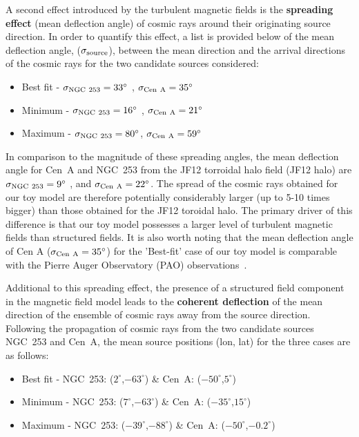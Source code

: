 \documentclass[usenatbib]{mnras}
\begin{document}
A second effect introduced by the turbulent magnetic fields is the {\bf spreading effect} (mean deflection angle) of cosmic rays around their originating source direction. In order to quantify this effect, a list is provided below of the mean deflection angle, ($\sigma_{\rm source}$), between the mean direction and the arrival directions of the cosmic rays for the two candidate sources considered:
\newline
\begin{itemize}
        \item Best fit - $\sigma_{\rm NGC~253} = 33^{\circ}$ , {$\sigma_{\rm Cen~A} = 35^{\circ}$}
        \item Minimum - $\sigma_{\rm NGC~253} = 16^{\circ}$ , $\sigma_{\rm Cen~A} = 21^{\circ}$
        \item Maximum - $\sigma_{\rm NGC~253} = 80^{\circ}$, $\sigma_{\rm Cen~A} = 59^{\circ}$
\end{itemize}

In comparison to the magnitude of these spreading angles, the mean deflection angle for Cen~A and NGC~253 from the JF12 torroidal halo field (JF12 halo) \citep{JF12}  are  $\sigma_{\rm NGC~253} = 9^{\circ}$ , and {$\sigma_{\rm Cen~A} = 22^{\circ}$}.  The spread of the cosmic rays obtained for our toy model are therefore potentially considerably larger (up to 5-10 times bigger) than those obtained for the JF12 toroidal halo. The primary driver of this difference is that our toy model possesses a larger level of turbulent magnetic fields than structured fields. It is also worth noting that the mean deflection angle of Cen A ($\sigma_{\rm Cen~A} = 35^{\circ}$) for the 'Best-fit' case of our toy model is comparable with the Pierre Auger Observatory (PAO) observations~\citep{PierreAuger_2014, Auger_ICRC_2021}. 

Additional to this spreading effect, the presence of a structured field component in the magnetic field model leads to the {\bf coherent deflection} of the mean direction of the ensemble of cosmic rays away from the source direction. Following the propagation of cosmic rays from the two candidate sources NGC~253 and Cen~A, the mean source positions (lon, lat) for the three cases are as follows:
\begin{itemize}
    \item Best fit - NGC~253: ($2^{\circ}$,$-63^{\circ}$) \& Cen~A: ($-50^{\circ}$,$5^{\circ}$) 
    \item Minimum - NGC~253: ($7^{\circ}$,$-63^{\circ}$) \& Cen~A: ($-35^{\circ}$,$15^{\circ}$) 
    \item Maximum - NGC~253: ($-39^{\circ}$,$-88^{\circ}$) \& Cen~A: ($-50^{\circ}$,$-0.2^{\circ}$) 
\end{itemize}
\end{document}
